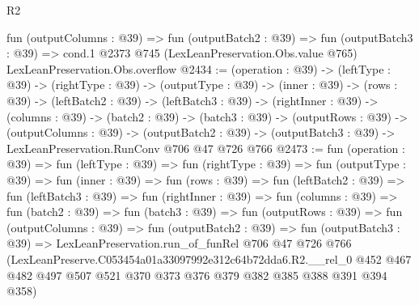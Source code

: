 \begin{lexlean}{R2}
\begin{coremodule}
  fun (outputColumns : @39) =>
  fun (outputBatch2 : @39) =>
  fun (outputBatch3 : @39) =>
  cond.{1} @2373 @745 (LexLeanPreservation.Obs.value @765) LexLeanPreservation.Obs.overflow
@2434 := (operation : @39) ->
  (leftType : @39) ->
  (rightType : @39) ->
  (outputType : @39) ->
  (inner : @39) ->
  (rows : @39) ->
  (leftBatch2 : @39) ->
  (leftBatch3 : @39) ->
  (rightInner : @39) ->
  (columns : @39) ->
  (batch2 : @39) ->
  (batch3 : @39) ->
  (outputRows : @39) ->
  (outputColumns : @39) ->
  (outputBatch2 : @39) -> (outputBatch3 : @39) -> LexLeanPreservation.RunConv @706 @47 @726 @766
@2473 := fun (operation : @39) =>
  fun (leftType : @39) =>
  fun (rightType : @39) =>
  fun (outputType : @39) =>
  fun (inner : @39) =>
  fun (rows : @39) =>
  fun (leftBatch2 : @39) =>
  fun (leftBatch3 : @39) =>
  fun (rightInner : @39) =>
  fun (columns : @39) =>
  fun (batch2 : @39) =>
  fun (batch3 : @39) =>
  fun (outputRows : @39) =>
  fun (outputColumns : @39) =>
  fun (outputBatch2 : @39) =>
  fun (outputBatch3 : @39) =>
  LexLeanPreservation.run_of_funRel
    @706
    @47
    @726
    @766
    (LexLeanPreserve.C053454a01a33097992e312c64b72dda6.R2.__rel_0
      @452
      @467
      @482
      @497
      @507
      @521
      @370
      @373
      @376
      @379
      @382
      @385
      @388
      @391
      @394
      @358)
\end{coremodule}
\end{lexlean}
